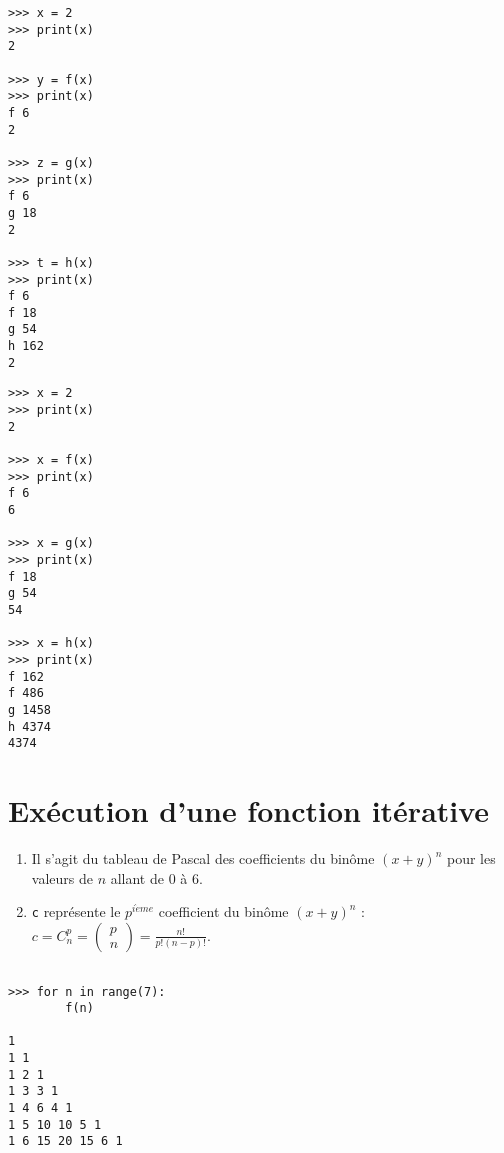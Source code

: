\documentclass[11pt,a4paper]{article}
\begin{document}
\begin{minipage}[t]{7cm}\footnotesize
\begin{verbatim}
>>> x = 2
>>> print(x)
2

>>> y = f(x)
>>> print(x)
f 6
2

>>> z = g(x)
>>> print(x)
f 6
g 18
2

>>> t = h(x)
>>> print(x)
f 6
f 18
g 54
h 162
2
\end{verbatim}
\end{minipage}
\hfill
\begin{minipage}[t]{7cm}\footnotesize
\begin{verbatim}
>>> x = 2
>>> print(x)
2

>>> x = f(x)
>>> print(x)
f 6
6

>>> x = g(x)
>>> print(x)
f 18
g 54
54

>>> x = h(x)
>>> print(x)
f 162
f 486
g 1458
h 4374
4374
\end{verbatim}
\end{minipage}

\section{Exécution d'une fonction itérative}
%

\noindent\begin{minipage}[t]{10cm}
\begin{enumerate}
\item Il s'agit du tableau de Pascal des coefficients du binôme $(x+y)^n$
	pour les valeurs de $n$ allant de 0 à 6.
\item {\tt c} représente le $p^{i\grave eme}$ coefficient du binôme $(x+y)^n$ :
	$\displaystyle c = C_n^p = \left(\begin{array}{c}p\\n\end{array}\right) =
	\frac{n!}{p!(n-p)!}$.
\end{enumerate}
\end{minipage}
\hfill
\begin{minipage}[t]{5cm}
\begin{verbatim}

>>> for n in range(7): 
        f(n)

1 
1 1 
1 2 1 
1 3 3 1 
1 4 6 4 1 
1 5 10 10 5 1 
1 6 15 20 15 6 1 
\end{verbatim}
\end{minipage}

\label{fini}
\end{document}
